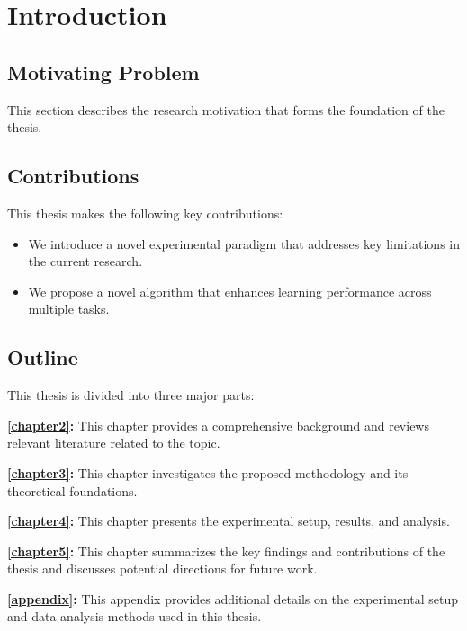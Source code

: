 \chapter{Introduction}
\label{chapter1}

\section{Motivating Problem}
\label{ch1:sec:motivation}
\begin{paragraph}
This section describes the research motivation that forms the foundation of the thesis.
\end{paragraph}

\section{Contributions}
\label{ch1:sec:Contributions}
\begin{paragraph}
This thesis makes the following key contributions:
\end{paragraph}

\begin{itemize}[leftmargin=\paritemindent]
    \item We introduce a novel experimental paradigm that addresses key limitations in the current research.
    \item We propose a novel algorithm that enhances learning performance across multiple tasks.
\end{itemize}

\section{Outline}
\label{ch1:sec:Outline}
\begin{paragraph}
This thesis is divided into three major parts:

\textbf{\autoref{chapter2}:} This chapter provides a comprehensive background and reviews relevant literature related to the topic.

\textbf{\autoref{chapter3}:} This chapter investigates the proposed methodology and its theoretical foundations.

\textbf{\autoref{chapter4}:} This chapter presents the experimental setup, results, and analysis.

\textbf{\autoref{chapter5}:} This chapter summarizes the key findings and contributions of the thesis and discusses potential directions for future work.

\textbf{\autoref{appendix}:} This appendix provides additional details on the experimental setup and data analysis methods used in this thesis.
\end{paragraph}